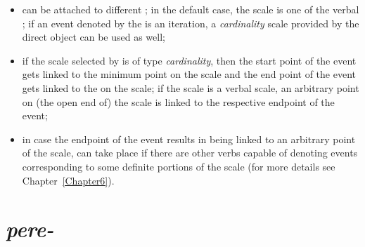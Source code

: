 \begin{itemize}
\item {} can be attached to different ; in the default case, the scale is one of the verbal ; if an event denoted by the  is an iteration, a \textit{cardinality} scale provided by the direct object can be used as well;
\item if the scale selected by  is of type \textit{cardinality}, then the start point of the event gets linked to the minimum point on the scale and the end point of the event gets linked to the  on the scale; if the scale is a verbal scale, an arbitrary point on (the open end of) the scale is linked to the respective endpoint of the event;
\item in case the endpoint of the event results in being linked to an arbitrary point of the scale,  can take place if there are other verbs capable of denoting events corresponding to some definite portions of the scale (for more details see Chapter~\ref{Chapter6}).
\end{itemize}



\section{\textit{pere-}}\label{subsection:semantics:pere}
